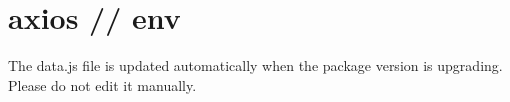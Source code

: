 \chapter{axios // env}
\hypertarget{md_node__modules_2axios_2lib_2env_2_r_e_a_d_m_e}{}\label{md_node__modules_2axios_2lib_2env_2_r_e_a_d_m_e}
\label{md_node__modules_2axios_2lib_2env_2_r_e_a_d_m_e_autotoc_md152}%
%
 The {\ttfamily data.\+js} file is updated automatically when the package version is upgrading. Please do not edit it manually. 